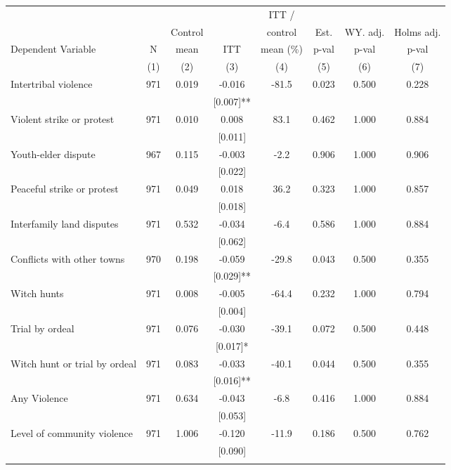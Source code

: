 \begin{tabular}{lccccccc}
\hline \noalign{\smallskip} &  &  &  & ITT / &  &  & \\
 &  & Control &  & control & Est. & WY. adj. & Holms adj.\\
Dependent Variable & N & mean & ITT & mean (\%) & p-val & p-val & p-val\\
 & (1) & (2) & (3) & (4) & (5) & (6) & (7)\\
\noalign{\smallskip}\hline \noalign{\smallskip}\quad Intertribal violence & 971 & 0.019 & -0.016 & -81.5 & 0.023 & 0.500 & 0.228\\
 &  &  & [0.007]** &  &  &  & \\
\quad Violent strike or protest & 971 & 0.010 & 0.008 & 83.1 & 0.462 & 1.000 & 0.884\\
 &  &  & [0.011] &  &  &  & \\
\quad Youth-elder dispute & 967 & 0.115 & -0.003 & -2.2 & 0.906 & 1.000 & 0.906\\
 &  &  & [0.022] &  &  &  & \\
\quad Peaceful strike or protest & 971 & 0.049 & 0.018 & 36.2 & 0.323 & 1.000 & 0.857\\
 &  &  & [0.018] &  &  &  & \\
\quad Interfamily land disputes & 971 & 0.532 & -0.034 & -6.4 & 0.586 & 1.000 & 0.884\\
 &  &  & [0.062] &  &  &  & \\
\quad Conflicts with other towns & 970 & 0.198 & -0.059 & -29.8 & 0.043 & 0.500 & 0.355\\
 &  &  & [0.029]** &  &  &  & \\
\quad Witch hunts & 971 & 0.008 & -0.005 & -64.4 & 0.232 & 1.000 & 0.794\\
 &  &  & [0.004] &  &  &  & \\
\quad Trial by ordeal & 971 & 0.076 & -0.030 & -39.1 & 0.072 & 0.500 & 0.448\\
 &  &  & [0.017]* &  &  &  & \\
\quad Witch hunt or trial by ordeal & 971 & 0.083 & -0.033 & -40.1 & 0.044 & 0.500 & 0.355\\
 &  &  & [0.016]** &  &  &  & \\
Any Violence & 971 & 0.634 & -0.043 & -6.8 & 0.416 & 1.000 & 0.884\\
 &  &  & [0.053] &  &  &  & \\
Level of community violence & 971 & 1.006 & -0.120 & -11.9 & 0.186 & 0.500 & 0.762\\
 &  &  & [0.090] &  &  &  & \\
\noalign{\smallskip}\hline\end{tabular}
